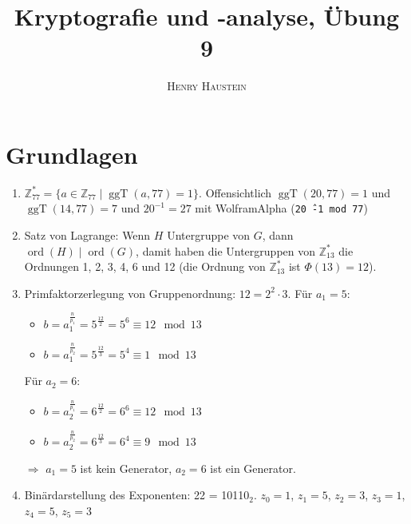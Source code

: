 \documentclass{article}
\title{\textbf{Kryptografie und -analyse, Übung 9}}
\author{\textsc{Henry Haustein}}
\date{}
\DeclareMathOperator{\ggT}{ggT}
\DeclareMathOperator{\ord}{ord}
\begin{document}
	\maketitle

	\section*{Grundlagen}
	\begin{enumerate}[label=(\alph*)]
		\item $\mathbb{Z}_{77}^\ast = \{a\in\mathbb{Z}_{77}\mid \ggT(a,77) = 1\}$. Offensichtlich $\ggT(20,77) = 1$ und $\ggT(14,77) = 7$ und $20^{-1} = 27$ mit WolframAlpha (\texttt{20\^\,-1 mod 77})
		\item Satz von Lagrange: Wenn $H$ Untergruppe von $G$, dann $\ord(H)\mid \ord(G)$, damit haben die Untergruppen von $\mathbb{Z}_{13}^\ast$ die Ordnungen 1, 2, 3, 4, 6 und 12 (die Ordnung von $\mathbb{Z}_{13}^\ast$ ist $\Phi(13) = 12$).
		\item Primfaktorzerlegung von Gruppenordnung: $12 = 2^2\cdot 3$. Für $a_1=5$:
		\begin{itemize}
			\item $b= a_1^{\frac{n}{p_1}} = 5^{\frac{12}{2}} = 5^6 \equiv 12 \mod 13$
			\item $b= a_1^{\frac{n}{p_2}} = 5^{\frac{12}{3}} = 5^4 \equiv 1 \mod 13$
		\end{itemize}
		Für $a_2 = 6$:
		\begin{itemize}
			\item $b= a_2^{\frac{n}{p_1}} = 6^{\frac{12}{2}} = 6^6 \equiv 12 \mod 13$
			\item $b= a_2^{\frac{n}{p_2}} = 6^{\frac{12}{3}} = 6^4 \equiv 9 \mod 13$
		\end{itemize}
		$\Rightarrow$ $a_1=5$ ist kein Generator, $a_2=6$ ist ein Generator.
		\item Binärdarstellung des Exponenten: 22 = 10110$_2$. $z_0 = 1$, $z_1 = 5$, $z_2 = 3$, $z_3 = 1$, $z_4 = 5$, $z_5 = 3$
	\end{enumerate}
\end{document}
